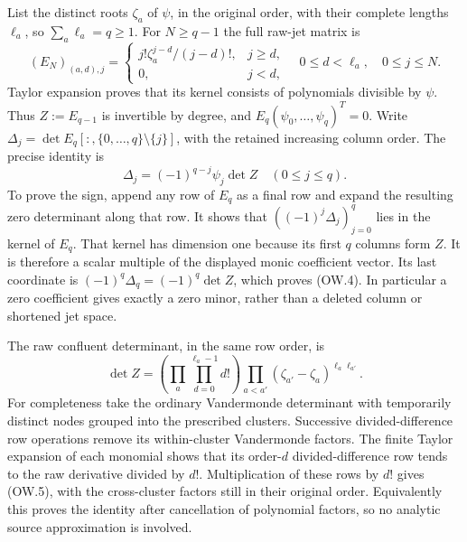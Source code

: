 \documentclass[11pt]{article}
\begin{document}
List the distinct roots $\zeta_a$ of $\psi$, in the original order,
with their complete lengths $\ell_a$, so $\sum_a\ell_a=q\ge1$.
For $N\ge q-1$ the full raw-jet matrix is
\[
 (E_N)_{(a,d),j}=
 \begin{cases}j!\zeta_a^{j-d}/(j-d)!,&j\ge d,\\0,&j<d,
 \end{cases}
 \quad 0\le d<\ell_a,\quad0\le j\le N.                  \tag{OW.3}
\]
Taylor expansion proves that its kernel consists of polynomials
divisible by $\psi$. Thus $Z:=E_{q-1}$ is invertible by degree,
and $E_q(\psi_0,\ldots,\psi_q)^T=0$. Write
$\Delta_j=\det E_q[:,\{0,\ldots,q\}\setminus\{j\}]$, with
the retained increasing column order. The precise identity is
\[
 \boxed{\Delta_j=(-1)^{q-j}\psi_j\det Z\quad(0\le j\le q).}
 \tag{OW.4}
\]
To prove the sign, append any row of $E_q$ as a final row and expand
the resulting zero determinant along that row. It shows that
$((-1)^j\Delta_j)_{j=0}^q$ lies in the kernel of $E_q$.
That kernel has dimension one because its first $q$ columns form $Z$.
It is therefore a scalar multiple of the displayed monic coefficient
vector. Its last coordinate is $(-1)^q\Delta_q=(-1)^q\det Z$,
which proves (OW.4). In particular a zero coefficient gives exactly
a zero minor, rather than a deleted column or shortened jet space.

The raw confluent determinant, in the same row order, is
\[
 \det Z=\left(\prod_a\prod_{d=0}^{\ell_a-1}d!\right)
          \prod_{a<a'}(\zeta_{a'}-\zeta_a)^{\ell_a\ell_{a'}}.
 \tag{OW.5}
\]
For completeness take the ordinary Vandermonde determinant with
temporarily distinct nodes grouped into the prescribed clusters.
Successive divided-difference row operations remove its within-cluster
Vandermonde factors. The finite Taylor expansion of each monomial
shows that its order-$d$ divided-difference row tends to the raw
derivative divided by $d!$. Multiplication of these rows by $d!$
gives (OW.5), with the cross-cluster factors still in their original
order. Equivalently this proves the identity after cancellation of
polynomial factors, so no analytic source approximation is involved.
\end{document}
